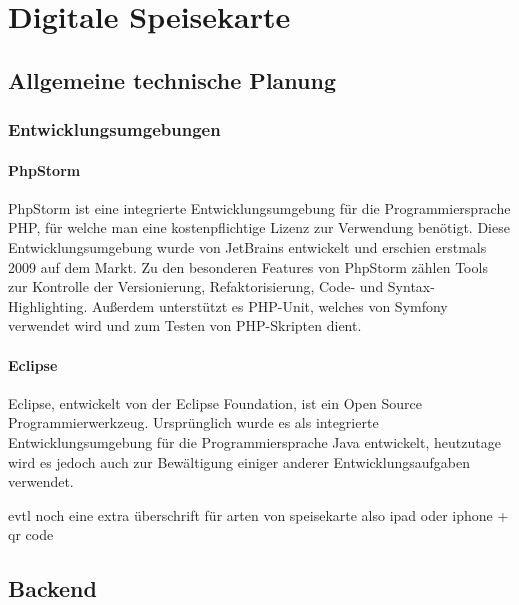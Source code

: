 \chapter{Digitale Speisekarte}
\renewcommand{\kapitelautor}{Autor: Katharina Joksch}

\section{Allgemeine technische Planung}

  \subsection{Entwicklungsumgebungen}

    \subsubsection{PhpStorm}
    
PhpStorm ist eine integrierte Entwicklungsumgebung für die Programmiersprache PHP, für welche man eine kostenpflichtige Lizenz zur Verwendung benötigt. Diese Entwicklungsumgebung wurde von JetBrains entwickelt und erschien erstmals 2009 auf dem Markt. Zu den besonderen Features von PhpStorm zählen Tools zur Kontrolle der Versionierung, Refaktorisierung, Code- und Syntax-Highlighting. Außerdem unterstützt es PHP-Unit, welches von Symfony verwendet wird und zum Testen von PHP-Skripten dient.

    \subsubsection{Eclipse}
    
Eclipse, entwickelt von der Eclipse Foundation, ist ein Open Source Programmierwerkzeug. Ursprünglich wurde es als integrierte Entwicklungsumgebung für die Programmiersprache Java entwickelt, heutzutage wird es jedoch auch zur Bewältigung einiger anderer Entwicklungsaufgaben verwendet.

evtl noch eine extra überschrift für arten von speisekarte also ipad oder iphone + qr code

\section{Backend}

